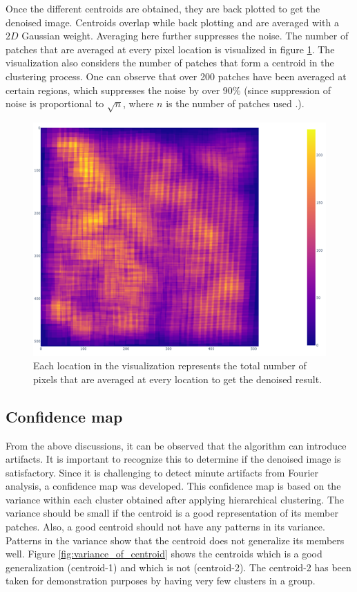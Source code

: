 \documentclass[fleqn,10pt]{wlscirep}
\begin{document}
Once the different centroids are obtained, they are back plotted to get the denoised image. Centroids overlap while back plotting and are averaged with a $2D$ Gaussian weight. Averaging here further suppresses the noise. The number of patches that are averaged at every pixel location is visualized in figure \ref{fig:visualization of number of patches}. The visualization also considers the number of patches that form a centroid in the clustering process. One can observe that over 200 patches have been averaged at certain regions, which suppresses the noise by over 90\%  (since suppression of noise is proportional to $\sqrt{n}$, where $n$ is the number of patches used \cite{bcm_nlm}.).

\begin{figure}[H]
	\centering
	\includegraphics[scale=0.6]{./imgs/visualization of number of patches.png}
	\caption[Visualization of the number of patches averaged at every pixel location]{Each location in the visualization represents the total number of pixels that are averaged at every location to get the denoised result.}
	\label{fig:visualization of number of patches}
\end{figure}

\subsection*{Confidence map}
From the above discussions, it can be observed that the algorithm can introduce artifacts. It is important to recognize this to determine if the denoised image is satisfactory. Since it is challenging to detect minute artifacts from Fourier analysis, a confidence map was developed. This confidence map is based on the variance within each cluster obtained after applying hierarchical clustering. The variance should be small if the centroid is a good representation of its member patches. Also, a good centroid should not have
any patterns in its variance. Patterns in the variance show that the centroid does not generalize its members well. Figure \ref{fig:variance_of_centroid} shows the centroids which is a good generalization (centroid-1) and which is not (centroid-2). The centroid-2 has been taken for demonstration purposes by having very few clusters in a group. 
\end{document}
